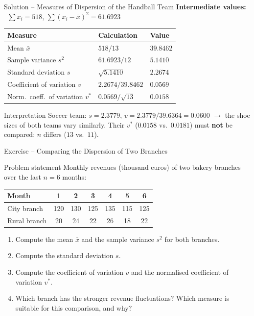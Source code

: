 \documentclass[aspectratio=169,11pt]{beamer}
\begin{document}
\begin{frame}{Solution -- Measures of Dispersion of the Handball Team}
  \textbf{Intermediate values:} \ $\sum x_i = 518$, \quad $\sum (x_i - \bar{x})^2 = 61.6923$
  \begin{center}
    \renewcommand{\arraystretch}{1.15}
    \begin{tabular}{lll}
      \toprule
      \textbf{Measure} & \textbf{Calculation} & \textbf{Value} \\
      \midrule
      Mean $\bar{x}$ & $518 / 13$ & $\mathbf{39.8462}$ \\[2pt]
      Sample variance $s^2$ & $61.6923 / 12$ & $\mathbf{5.1410}$ \\[2pt]
      Standard deviation $s$ & $\sqrt{5.1410}$ & $\mathbf{2.2674}$ \\[2pt]
      Coefficient of variation $v$ & $2.2674 / 39.8462$ & $\mathbf{0.0569}$ \\[2pt]
      Norm.\ coeff.\ of variation $v^*$ & $0.0569 / \sqrt{13}$ & $\mathbf{0.0158}$ \\
      \bottomrule
    \end{tabular}
  \end{center}
  \begin{alertblock}{Interpretation}
    Soccer team: $s = 2.3779$, $v = 2.3779 / 39.6364 = 0.0600$ $\to$ the shoe sizes of both
    teams vary similarly. Their $v^*$ ($0.0158$ vs.\ $0.0181$) must \textbf{not} be compared: $n$ differs
    ($13$ vs.\ $11$).
  \end{alertblock}
\end{frame}

\begin{frame}{Exercise -- Comparing the Dispersion of Two Branches}
  \begin{block}{Problem statement}
    Monthly revenues (thousand euros) of two bakery branches over the last $n = 6$ months:
    \begin{center}
      \renewcommand{\arraystretch}{1.05}
      \begin{tabular}{lcccccc}
        \toprule
        Month & 1 & 2 & 3 & 4 & 5 & 6 \\
        \midrule
        City branch  & 120 & 130 & 125 & 135 & 115 & 125 \\
        Rural branch & 20  & 24  & 22  & 26  & 18  & 22  \\
        \bottomrule
      \end{tabular}
    \end{center}
    \begin{enumerate}
      \item[a)] Compute the mean $\bar{x}$ and the sample variance $s^2$ for both branches.
      \item[b)] Compute the standard deviation $s$.
      \item[c)] Compute the coefficient of variation $v$ and the normalised coefficient of variation $v^*$.
      \item[d)] Which branch has the stronger revenue fluctuations? Which measure is suitable
        for this comparison, and why?
    \end{enumerate}
  \end{block}
\end{frame}
\end{document}
